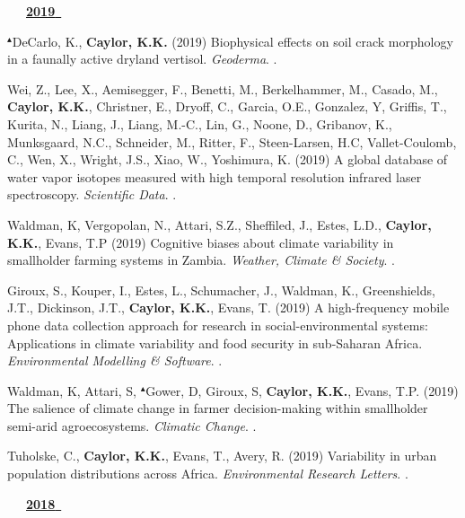 \begin{etaremune}
\vspace{0.1in}
\mbox{\ \ \ \underline{\textbf{2019 }}}
\vspace{0.1in}

\item $^{\blacktriangle}$DeCarlo, K., \textbf{ Caylor, K.K.} (2019) Biophysical effects on soil crack morphology in a faunally active dryland vertisol. \emph{Geoderma}. .
\item Wei, Z., Lee, X., Aemisegger, F., Benetti, M., Berkelhammer, M., Casado, M., \textbf{ Caylor, K.K.}, Christner, E., Dryoff, C., Garcia, O.E., Gonzalez, Y, Griffis, T., Kurita, N., Liang, J., Liang, M.-C., Lin, G., Noone, D., Gribanov, K., Munksgaard, N.C., Schneider, M., Ritter, F., Steen-Larsen, H.C, Vallet-Coulomb, C., Wen, X., Wright, J.S., Xiao, W., Yoshimura, K. (2019) A global database of water vapor isotopes measured with high temporal resolution infrared laser spectroscopy. \emph{Scientific Data}. .
\item Waldman, K, Vergopolan, N., Attari, S.Z., Sheffiled, J., Estes, L.D., \textbf{ Caylor, K.K.}, Evans, T.P (2019) Cognitive biases about climate variability in smallholder farming systems in Zambia. \emph{Weather, Climate \& Society}. .
\item Giroux, S., Kouper, I., Estes, L., Schumacher, J., Waldman, K., Greenshields, J.T., Dickinson, J.T., \textbf{ Caylor, K.K.}, Evans, T. (2019) A high-frequency mobile phone data collection approach for research in social-environmental systems: Applications in climate variability and food security in sub-Saharan Africa. \emph{Environmental Modelling \& Software}. .
\item Waldman, K, Attari, S, $^{\blacktriangle}$Gower, D, Giroux, S, \textbf{ Caylor, K.K.}, Evans, T.P. (2019) The salience of climate change in farmer decision-making within smallholder semi-arid agroecosystems. \emph{Climatic Change}. .
\item Tuholske, C., \textbf{ Caylor, K.K.}, Evans, T., Avery, R. (2019) Variability in urban population distributions across Africa. \emph{Environmental Research Letters}. .

\vspace{0.1in}
\mbox{\ \ \ \underline{\textbf{2018 }}}
\vspace{0.1in}


\end{etaremune}
